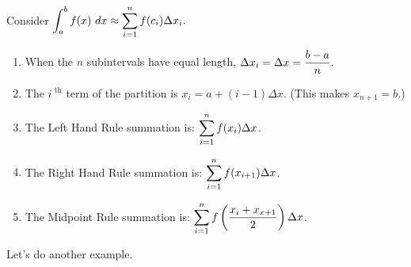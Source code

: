 {Consider $\displaystyle \int_a^b f(x) \ dx \approx \sum_{i=1}^n f(c_i)\Delta x_i.$ 

\begin{enumerate}
\item	When the $n$ subintervals have equal length, $\displaystyle \Delta x_i = \Delta x = \frac{b-a}n.$
\item		The $i^\text{ th}$ term of the partition is $x_i = a + (i-1)\Delta x$. (This makes $x_{n+1} = b$.)
\item		The Left Hand Rule summation is: $\displaystyle \sum_{i=1}^n f(x_i)\Delta x$.
\item		The Right Hand Rule summation is: $\displaystyle \sum_{i=1}^n f(x_{i+1})\Delta x$.
\item		The Midpoint Rule summation is: $\displaystyle \sum_{i=1}^n f\left(\frac{x_i+x_{x+1}}{2}\right)\Delta x$.
\end{enumerate}
}
\restoreboxwidth
%
%
%


Let's do another example.\\

